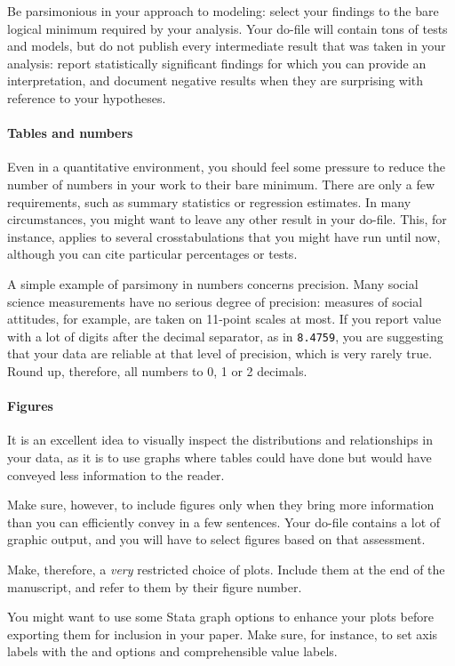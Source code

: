   Be parsimonious in your approach to modeling: select your findings to the bare logical minimum required by your analysis. Your do-file will contain tons of tests and models, but do not publish every intermediate result that was taken in your analysis: report statistically significant findings for which you can provide an interpretation, and document negative results when they are surprising with reference to your hypotheses.%

\paragraph{Tables and numbers} Even in a quantitative environment, you should feel some pressure to reduce the number of numbers in your work to their bare minimum. There are only a few requirements, such as summary statistics or regression estimates. In many circumstances, you might want to leave any other result in your do-file. This, for instance, applies to several crosstabulations that you might have run until now, although you can cite particular percentages or tests.%

  A simple example of parsimony in numbers concerns precision. Many social science measurements have no serious degree of precision: measures of social attitudes, for example, are taken on 11-point scales at most. If you report value with a lot of digits after the decimal separator, as in \texttt{8.4759}, you are suggesting that your data are reliable at that level of precision, which is very rarely true. Round up, therefore, all numbers to 0, 1 or 2 decimals.%

\paragraph{Figures} It is an excellent idea to visually inspect the distributions and relationships in your data, as it is to use graphs where tables could have done but would have conveyed less information to the reader.%

  Make sure, however, to include figures only when they bring more information than you can efficiently convey in a few sentences. Your do-file contains a lot of graphic output, and you will have to select figures based on that assessment.%

  Make, therefore, a \emph{very} restricted choice of plots. Include them at the end of the manuscript, and refer to them by their figure number.%

  You might want to use some Stata graph options to enhance your plots before exporting them for inclusion in your paper. Make sure, for instance, to set axis labels with the  and  options and comprehensible value labels.%


